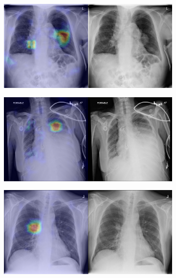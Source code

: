\begin{figure}[b]
\begin{subfigure}{0.4\textwidth}
    \end{subfigure}
    \begin{subfigure}{0.4\textwidth}
        \centering
        \includegraphics[width=1.0\textwidth]{Chapters/5. Conclusiones/img/Mass/1_1_00001900_021.png}
    \end{subfigure}
    \begin{subfigure}{0.4\textwidth}
        \centering
        \includegraphics[width=1.0\textwidth]{Chapters/5. Conclusiones/img/Mass/1_1_00022369_006.png}
    \end{subfigure}
    \begin{subfigure}{0.4\textwidth}
        \centering
        \includegraphics[width=1.0\textwidth]{Chapters/5. Conclusiones/img/Mass/1_1_00022572_027.png}

\end{subfigure}
\end{figure}
